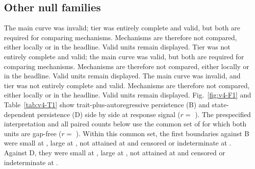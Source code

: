 \subsection{Other null families}
The main curve was invalid; tier  was entirely complete and valid, but both are required for comparing mechanisms. Mechanisms are therefore not compared, either locally or in the headline. Valid units remain displayed. %
Tier  was not entirely complete and valid; the main curve was valid, but both are required for comparing mechanisms. Mechanisms are therefore not compared, either locally or in the headline. Valid units remain displayed. %
The main curve was invalid, and tier  was not entirely complete and valid. Mechanisms are therefore not compared, either locally or in the headline. Valid units remain displayed. %
Fig.~\ref{fig:v4-F1} and Table~\ref{tab:v4-T1} show trait-plus-autoregressive persistence (B) and state-dependent persistence (D) side by side at   response signal  ($r=$ ). The prespecified interpretation and all paired counts below use the common set of   for which both units are gap-free ($r=$ ). %
Within this common set, the first boundaries against B were small at  , large at , not attained at  and censored or indeterminate at . Against D, they were small at  , large at , not attained at  and censored or indeterminate at . %
